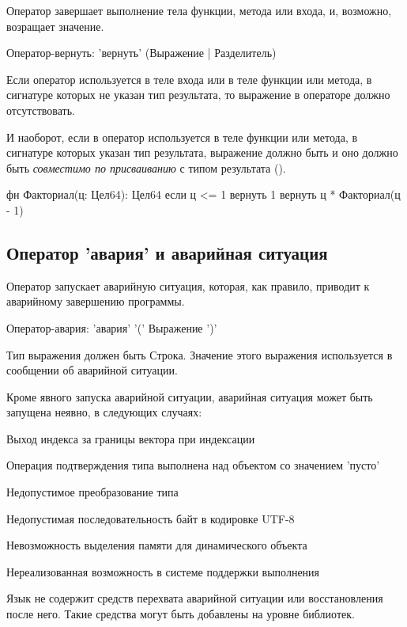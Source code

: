 Оператор  завершает выполнение тела функции, метода или входа, и, возможно, возращает значение.

\begin{Grammar}
Оператор-вернуть: 'вернуть'  (Выражение | Разделитель)
\end{Grammar}

Если оператор  используется в теле входа или в теле функции или метода, в сигнатуре которых не указан тип результата, 
то выражение в операторе должно отсутствовать.

И наоборот, если в оператор используется в теле функции или метода, в сигнатуре которых указан тип результата, выражение должно быть и 
оно должно быть \emph{совместимо по присваиванию} с типом результата ().

\begin{Trivil}
фн Факториал(ц: Цел64): Цел64 {
    если ц <= 1 { вернуть 1 }
    вернуть ц * Факториал(ц - 1)
}
\end{Trivil}

\hypertarget{crash-stmt}{%
\subsection{Оператор 'авария' и аварийная ситуация}\label{stmt:crash-stmt}}

Оператор  запускает аварийную ситуация, которая, как правило, приводит к аварийному завершению программы. 

\begin{Grammar}
Оператор-авария: 'авария' '(' Выражение ')'
\end{Grammar}

Тип выражения должен быть Строка. Значение этого выражения используется в сообщении об аварийной ситуации.

Кроме явного запуска аварийной ситуации, аварийная ситуация может быть запущена неявно, в следующих случаях:
\begin{d_itemize}
\item
    Выход индекса за границы вектора при индексации
\item
    Операция подтверждения типа выполнена над объектом со значением 'пусто'
\item
    Недопустимое преобразование типа 
\item
    Недопустимая последовательность байт в кодировке UTF-8
\item
    Невозможность выделения памяти для динамического объекта
\item
    Нереализованная возможность в системе поддержки выполнения
\end{d_itemize}

\bigskip
Язык \thelang{} не содержит средств перехвата аварийной ситуации или восстановления после него. 
Такие средства могут быть добавлены на уровне библиотек.
